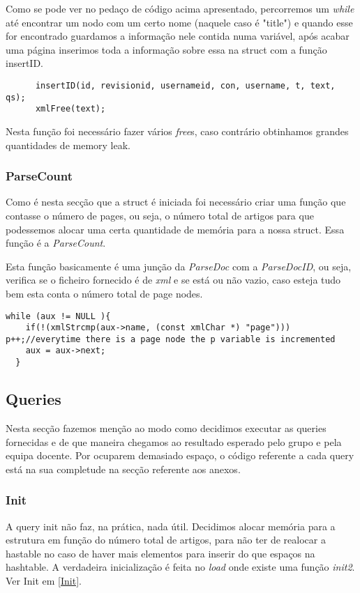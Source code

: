 \documentclass{article}
\begin{document}
\par Como se pode ver no pedaço de código acima apresentado, percorremos um \emph{while} até encontrar um nodo com um certo nome (naquele caso é "title") e quando esse for encontrado guardamos a informação nele contida numa variável, após acabar uma página inserimos toda a informação sobre essa na struct com a função insertID.

\begin{lstlisting}
      insertID(id, revisionid, usernameid, con, username, t, text, qs);
      xmlFree(text);
\end{lstlisting}

\par Nesta função foi necessário fazer vários \emph{free}s, caso contrário obtinhamos grandes quantidades de memory leak.

\subsubsection{ParseCount}
\par Como é nesta secção que a struct é iniciada foi necessário criar uma função que contasse o número de pages, ou seja, o número total de artigos para que podessemos alocar uma certa quantidade de memória para a nossa struct. Essa função é a \emph{ParseCount}.
\par Esta função basicamente é uma junção da \emph{ParseDoc} com a \emph{ParseDocID}, ou seja, verifica se o ficheiro fornecido é de \emph{xml} e se está ou não vazio, caso esteja tudo bem esta conta o número total de page nodes.

\begin{lstlisting}
while (aux != NULL ){
    if(!(xmlStrcmp(aux->name, (const xmlChar *) "page"))) p++;//everytime there is a page node the p variable is incremented
    aux = aux->next;
  }
\end{lstlisting}

\subsection{Queries}
\par Nesta secção fazemos menção ao modo como decidimos executar as queries fornecidas e de que maneira chegamos ao resultado esperado pelo grupo e pela equipa docente. Por ocuparem demasiado espaço, o código referente a cada query está na sua completude na secção referente aos anexos.

\subsubsection{Init}
\par A query init não faz, na prática, nada útil. Decidimos alocar memória para a estrutura em função do número total de artigos, para não ter de realocar a hastable no caso de haver mais elementos para inserir do que espaços na hashtable. A verdadeira inicialização é feita no \emph{load} onde existe uma função \emph{init2}. Ver Init em \ref{Init}.
\end{document}
